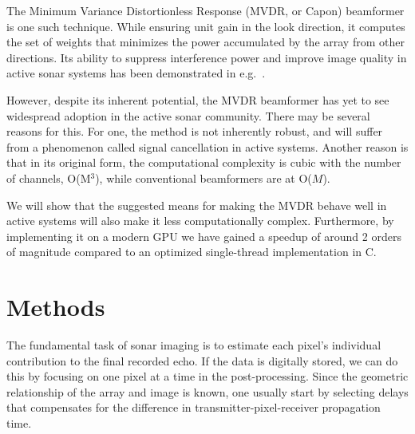 \documentclass[10pt,a4paper]{article}
\newcommand\1{\vec 1}
\begin{document}
The Minimum Variance Distortionless Response (MVDR, or Capon) beamformer is one such technique. While ensuring unit gain in the look direction, it computes the set of weights that minimizes the power accumulated by the array from other directions. Its ability to suppress interference power and improve image quality in active sonar systems has been demonstrated in e.g.~\cite{Blomberg2012a,Blomberg2011,Dursun2009,Lo2004}.

However, despite its inherent potential, the \gls{MVDR} beamformer has yet to see widespread adoption in the active sonar community. There may be several reasons for this. For one, the method is not inherently robust, and will suffer from a phenomenon called signal cancellation in active systems. Another reason is that in its original form, the computational complexity is cubic with the number of channels, O(M$^3$), while conventional beamformers are at O($M$).

We will show that the suggested means for making the \gls{MVDR} behave well in active systems will also make it less computationally complex. Furthermore, by implementing it on a modern \gls{GPU} we have gained a speedup of around 2 orders of magnitude compared to an optimized single-thread implementation in C.




\newpage
\section{Methods}\label{methods}

The fundamental task of sonar imaging is to estimate each pixel's individual contribution to the final recorded echo. If the data is digitally stored, we can do this by focusing on one pixel at a time in the post-processing. Since the geometric relationship of the array and image is known, one usually start by selecting delays that compensates for the difference in transmitter-pixel-receiver propagation time.
\end{document}
